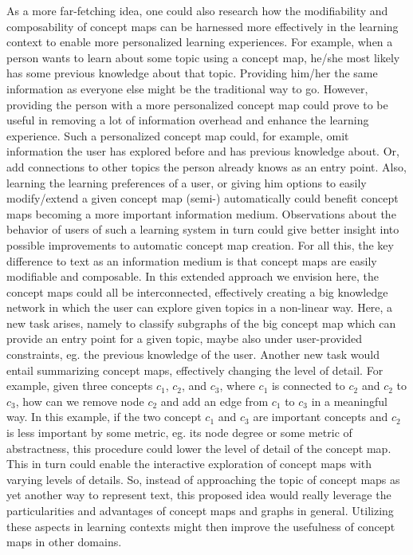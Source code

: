 As a more far-fetching idea, one could also research how the modifiability and composability of concept maps can be harnessed more effectively in the learning context to enable more personalized learning experiences.
For example, when a person wants to learn about some topic using a concept map, he/she most likely has some previous knowledge about that topic.
Providing him/her the same information as everyone else might be the traditional way to go. 
However, providing the person with a more personalized concept map could prove to be useful in removing a lot of information overhead and enhance the learning experience.
Such a personalized concept map could, for example, omit information the user has explored before and has previous knowledge about.
Or, add connections to other topics the person already knows as an entry point.
Also, learning the learning preferences of a user, or giving him options to easily modify/extend a given concept map (semi-) automatically could benefit concept maps becoming a more important information medium.
Observations about the behavior of users of such a learning system in turn could give better insight into possible improvements to automatic concept map creation.
For all this, the key difference to text as an information medium is that concept maps are easily modifiable and composable.
In this extended approach we envision here, the concept maps could all be interconnected, effectively creating a big knowledge network in which the user can explore given topics in a non-linear way.
Here, a new task arises, namely to classify subgraphs of the big concept map which can provide an entry point for a given topic, maybe also under user-provided constraints, eg. the previous knowledge of the user.
Another new task would entail summarizing concept maps, effectively changing the level of detail.
For example, given three concepts $c_1$, $c_2$, and $c_3$, where $c_1$ is connected to $c_2$ and $c_2$ to $c_3$, how can we remove node $c_2$ and add an edge from $c_1$ to $c_3$ in a meaningful way.
In this example, if the two concept $c_1$ and $c_3$ are important concepts and $c_2$ is less important by some metric, eg. its node degree or some metric of abstractness, this procedure could lower the level of detail of the concept map.
This in turn could enable the interactive exploration of concept maps with varying levels of details.
So, instead of approaching the topic of concept maps as yet another way to represent text, this proposed idea would really leverage the particularities and advantages of concept maps and graphs in general.
Utilizing these aspects in learning contexts might then improve the usefulness of concept maps in other domains.



